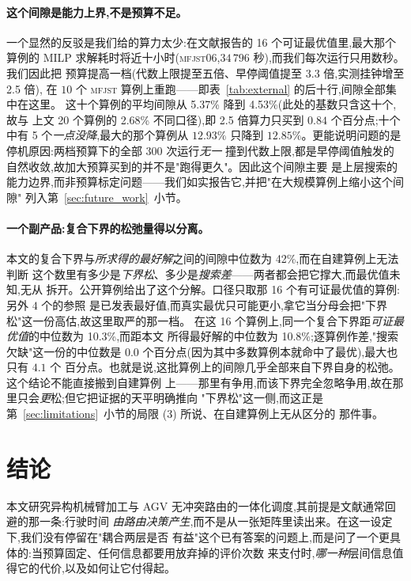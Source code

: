 \documentclass[manuscript,screen,review]{acmart}
\newcommand{\LBGapMed}{42\%}
\newcommand{\PubNInst}{20}
\newcommand{\PubNOpt}{16}                 %
\newcommand{\PubGapMean}{2.68\%}          %
\newcommand{\PubBudgetRatio}{2.5}
\newcommand{\PubGapLoBudget}{5.37\%}      %
\newcommand{\PubGapHiBudget}{4.53\%}      %
\newcommand{\PubBudgetGainPP}{0.84}       %
\newcommand{\PubBudgetNoGain}{5}          %
\newcommand{\PubLBSlack}{10.3\%}          %
\newcommand{\PubLBTotal}{10.8\%}          %
\newcommand{\PubLBResidMed}{0.0}          %
\newcommand{\PubLBResidMax}{4.1}          %
\begin{document}
\paragraph{这个间隙是能力上界,不是预算不足。}
一个显然的反驳是我们给的算力太少:在文献报告的 \PubNOpt{} 个可证最优值里,最大那个算例的
MILP 求解耗时将近十小时(\textsc{mfjst}06,$34\,796$ 秒),而我们每次运行只用数秒。我们因此把
预算提高一档(代数上限提至五倍、早停阈值提至 $3.3$ 倍,实测挂钟增至 \PubBudgetRatio{} 倍),
在 $10$ 个 \textsc{mfjst} 算例上重跑——即表~\ref{tab:external} 的后十行,间隙全部集中在这里。
这十个算例的平均间隙从 \PubGapLoBudget{} 降到 \PubGapHiBudget{}(此处的基数只含这十个,故与
上文 \PubNInst{} 个算例的 \PubGapMean{} 不同口径),即 \PubBudgetRatio{} 倍算力只买到
$\PubBudgetGainPP$ 个百分点;十个中有 \PubBudgetNoGain{} 个\emph{一点没降},最大的那个算例从
$12.93\%$ 只降到 $12.85\%$。更能说明问题的是停机原因:两档预算下的全部 $300$ 次运行\emph{无一}
撞到代数上限,都是早停阈值触发的自然收敛,故加大预算买到的并不是"跑得更久"。因此这个间隙主要
是上层搜索的能力边界,而非预算标定问题——我们如实报告它,并把"在大规模算例上缩小这个间隙"
列入第~\ref{sec:future_work}~小节。

\paragraph{一个副产品:复合下界的松弛量得以分离。}
本文的复合下界与\emph{所求得的最好解}之间的间隙中位数为 \LBGapMed{},而在自建算例上无法判断
这个数里有多少是\emph{下界松}、多少是\emph{搜索差}——两者都会把它撑大,而最优值未知,无从
拆开。公开算例给出了这个分解。口径只取那 \PubNOpt{} 个有可证最优值的算例:另外 $4$ 个的参照
是已发表最好值,而真实最优只可能更小,拿它当分母会把"下界松"这一份高估,故这里取严的那一档。
在这 \PubNOpt{} 个算例上,同一个复合下界距\emph{可证最优值}的中位数为 \PubLBSlack{},而距本文
所得最好解的中位数为 \PubLBTotal{};逐算例作差,"搜索欠缺"这一份的中位数是
$\PubLBResidMed$ 个百分点(因为其中多数算例本就命中了最优),最大也只有 $\PubLBResidMax$ 个
百分点。也就是说,这批算例上的间隙几乎全部来自下界自身的松弛。这个结论不能直接搬到自建算例
上——那里有争用,而该下界完全忽略争用,故在那里只会\emph{更}松;但它把证据的天平明确推向
"下界松"这一侧,而这正是第~\ref{sec:limitations}~小节的局限 (3) 所说、在自建算例上无从区分的
那件事。

\section{结论}
\label{sec:Chapter_VI}

本文研究异构机械臂加工与 AGV 无冲突路由的一体化调度,其前提是文献通常回避的那一条:行驶时间
\emph{由路由决策产生},而不是从一张矩阵里读出来。在这一设定下,我们没有停留在"耦合两层是否
有益"这个已有答案的问题上,而是问了一个更具体的:当预算固定、任何信息都要用放弃掉的评价次数
来支付时,\emph{哪一种}层间信息值得它的代价,以及如何让它付得起。
\end{document}
